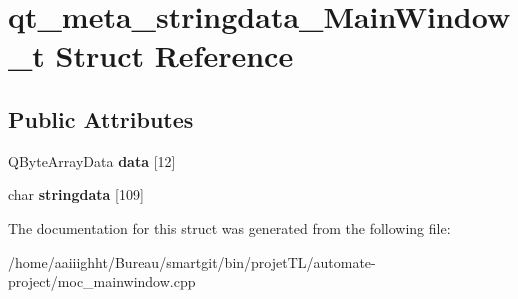 \hypertarget{structqt__meta__stringdata___main_window__t}{\section{qt\-\_\-meta\-\_\-stringdata\-\_\-\-Main\-Window\-\_\-t Struct Reference}
\label{structqt__meta__stringdata___main_window__t}
}
\subsection*{Public Attributes}
\begin{DoxyCompactItemize}
\item 
\hypertarget{structqt__meta__stringdata___main_window__t_afdbe51b886f1b7245f684cf5bf6e54bc}{Q\-Byte\-Array\-Data {\bfseries data} \mbox{[}12\mbox{]}}\label{structqt__meta__stringdata___main_window__t_afdbe51b886f1b7245f684cf5bf6e54bc}

\item 
\hypertarget{structqt__meta__stringdata___main_window__t_a90e79b2a0dac435689fea39ab28d39e3}{char {\bfseries stringdata} \mbox{[}109\mbox{]}}\label{structqt__meta__stringdata___main_window__t_a90e79b2a0dac435689fea39ab28d39e3}

\end{DoxyCompactItemize}


The documentation for this struct was generated from the following file\-:\begin{DoxyCompactItemize}
\item 
/home/aaiiighht/\-Bureau/smartgit/bin/projet\-T\-L/automate-\/project/moc\-\_\-mainwindow.\-cpp\end{DoxyCompactItemize}

